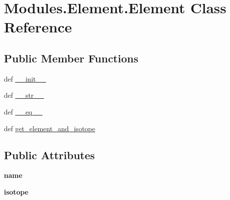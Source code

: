 \hypertarget{classModules_1_1Element_1_1Element}{\section{Modules.\-Element.\-Element Class Reference}
\label{classModules_1_1Element_1_1Element}
}
\subsection*{Public Member Functions}
\begin{DoxyCompactItemize}
\item 
def \hyperlink{classModules_1_1Element_1_1Element_aaf833476ec5e1ea65586c59dfec00df9}{\-\_\-\-\_\-init\-\_\-\-\_\-}
\item 
def \hyperlink{classModules_1_1Element_1_1Element_a7a7a9209ae83aa96adb7a51cda42574f}{\-\_\-\-\_\-str\-\_\-\-\_\-}
\item 
def \hyperlink{classModules_1_1Element_1_1Element_aa966376c457405db42de5279c4c38128}{\-\_\-\-\_\-eq\-\_\-\-\_\-}
\item 
def \hyperlink{classModules_1_1Element_1_1Element_a903672dc2f6856bc0ac2ac5862f8b068}{get\-\_\-element\-\_\-and\-\_\-isotope}
\end{DoxyCompactItemize}
\subsection*{Public Attributes}
\begin{DoxyCompactItemize}
\item 
\hypertarget{classModules_1_1Element_1_1Element_ae0ed1337973bdfbf2e694123b524d86a}{{\bfseries name}}\label{classModules_1_1Element_1_1Element_ae0ed1337973bdfbf2e694123b524d86a}

\item 
\hypertarget{classModules_1_1Element_1_1Element_a36586f144787a88e5c6e3fc5c8ba94f4}{{\bfseries isotope}}\label{classModules_1_1Element_1_1Element_a36586f144787a88e5c6e3fc5c8ba94f4}

\end{DoxyCompactItemize}


